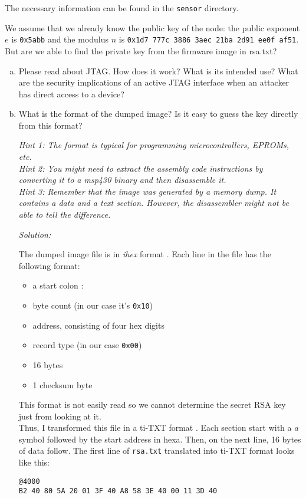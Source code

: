 \documentclass[a4paper,11pt]{article}
\newenvironment{solution}%
{\par{\noindent\small\textit{Solution:}}\vspace{-12pt}\begin{framed}}%
{\end{framed}\par}
\begin{document}
The necessary information can be found in the \texttt{sensor} directory.

We assume that we already know the public key of the node: the public exponent
$e$ is {\tt 0x5abb} and the modulus $n$ is {\tt 0x1d7 777c 3886 3aec 21ba 2d91
ee0f af51}. But are we able to find the private key from the firmware image in
rsa.txt?

\begin{enumerate}[(a)]

\item Please read about JTAG. How does it work? What is its intended use? What
are the security implications of an active JTAG interface when an attacker has
direct access to a device?

\item What is the format of the dumped image? Is it easy to guess the key
directly from this format?

\emph{Hint 1: The format is typical for programming microcontrollers, EPROMs,
etc.}
\\
\emph{Hint 2: You might need to extract the assembly code instructions by converting
it to a msp430 binary and then disassemble it.}
\\
\emph{Hint 3: Remember that the image was generated by a memory dump. It
contains a data and a text section. However, the disassembler might not be able
to tell the difference.}

\ifsolution\begin{solution}
The dumped image file is in \emph{ihex} format \cite{ihex}. Each line in the file
has the following format:
\begin{itemize}
  \item a start colon $:$
  \item byte count (in our case it's {\tt 0x10})
  \item address, consisting of four hex digits
  \item record type (in our case {\tt 0x00})
  \item 16 bytes
  \item 1 checksum byte
\end{itemize}

This format is not easily read so we cannot determine the secret RSA key just from
looking at it.\\
Thus, I transformed this file in a ti-TXT format \cite{titxt}. Each section start
with a $a$ symbol followed by the start address in hexa. Then, on the next line,
16 bytes of data follow. The first line of \texttt{rsa.txt} translated into ti-TXT
format looks like this:\\
\begin{lstlisting}
@4000
B2 40 80 5A 20 01 3F 40 A8 58 3E 40 00 11 3D 40
\end{lstlisting}


\end{solution}
\end{enumerate}
\end{document}
